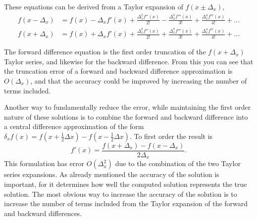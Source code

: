 These equations can be derived from a Taylor expansion of $f(x\pm\Delta_{x})$,
\begin{align}
f(x-\Delta_{x}) & = f(x)-\Delta_{x}f'(x)+\frac{\Delta_{x}^{2}f''(x)}{2!}-\frac{\Delta_{x}^{3}f'''(x)}{3!}+\frac{\Delta_{x}^{4}f^{iv}(x)}{4!}+...\label{eq:TaylorForward}\\
f(x+\Delta_{x}) & = f(x)+\Delta_{x}f'(x)+\frac{\Delta_{x}^{2}f''(x)}{2!}+\frac{\Delta_{x}^{3}f'''(x)}{3!}+\frac{\Delta_{x}^{4}f^{iv}(x)}{4!}+...\label{eq:TaylorBackward}
\end{align}


The forward difference equation is the first order truncation of the $f(x+\Delta_{x})$ Taylor series, and likewise for the backward difference.
From this you can see that the truncation error of a forward and backward difference approximation is $O(\Delta_{x})$, and that the accuracy could be improved by increasing the number of terms included.

Another way to fundamentally reduce the error, while maintaining the first order nature of these solutions is to combine the forward and backward difference into a central difference approximation of the form $\delta_{x}f(x)=f(x+\frac{1}{2}\Delta x)-f(x-\frac{1}{2}\Delta x)$.
To first order the result is 
\begin{equation}
f'(x)=\frac{f(x+\Delta_{x})-f(x-\Delta_{x})}{2\Delta_{x}}.\label{eq:First Order CD}
\end{equation}
This formulation has error $O(\Delta_{x}^{2})$ due to the combination of the two Taylor series expansions.
As already mentioned the accuracy of the solution is important, for it determines how well the computed solution represents the true solution.
The most obvious way to increase the accuracy of the solution is to increase the number of terms included from the Taylor expansion of the forward and backward differences.

